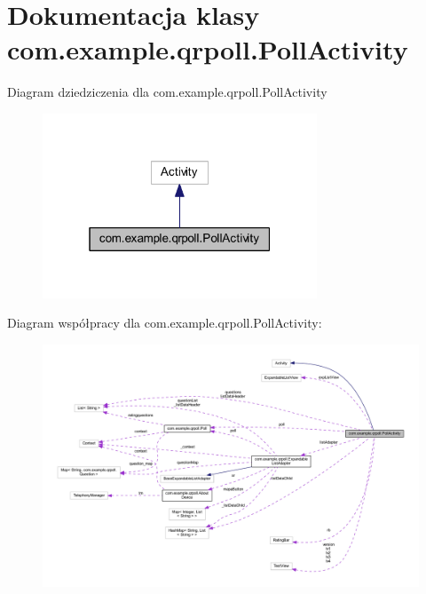 \hypertarget{classcom_1_1example_1_1qrpoll_1_1_poll_activity}{\section{Dokumentacja klasy com.\+example.\+qrpoll.\+Poll\+Activity}
\label{classcom_1_1example_1_1qrpoll_1_1_poll_activity}
}


Diagram dziedziczenia dla com.\+example.\+qrpoll.\+Poll\+Activity\nopagebreak
\begin{figure}[H]
\begin{center}
\leavevmode
\includegraphics[width=232pt]{classcom_1_1example_1_1qrpoll_1_1_poll_activity__inherit__graph}
\end{center}
\end{figure}


Diagram współpracy dla com.\+example.\+qrpoll.\+Poll\+Activity\+:
\nopagebreak
\begin{figure}[H]
\begin{center}
\leavevmode
\includegraphics[width=350pt]{classcom_1_1example_1_1qrpoll_1_1_poll_activity__coll__graph}
\end{center}
\end{figure}
